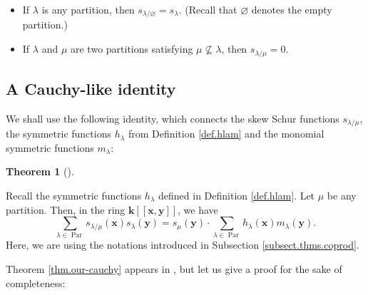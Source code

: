 \documentclass[numbers=enddot,12pt,final,onecolumn,notitlepage]{scrartcl}%
\theoremstyle{definition}
\newtheorem{theo}{Theorem}[section]
\newenvironment{theorem}[1][]
{\begin{theo}[#1]\begin{leftbar}}
{\end{leftbar}\end{theo}}
\let\sumnonlimits\sum
\renewcommand{\sum}{\sumnonlimits\limits}
\begin{document}
\begin{itemize}
\item If $\lambda$ is any partition, then $s_{\lambda/\varnothing}=s_{\lambda
}$. (Recall that $\varnothing$ denotes the empty partition.)

\item If $\lambda$ and $\mu$ are two partitions satisfying $\mu\not \subseteq
\lambda$, then $s_{\lambda/\mu}=0$.
\end{itemize}

\subsection{\label{subsect.proofs.cauchy}A Cauchy-like identity}

We shall use the following identity, which connects the skew Schur functions
$s_{\lambda/\mu}$, the symmetric functions $h_{\lambda}$ from Definition
\ref{def.hlam} and the monomial symmetric functions $m_{\lambda}$:

\begin{theorem}
\label{thm.our-cauchy}Recall the symmetric functions $h_{\lambda}$ defined in
Definition \ref{def.hlam}. Let $\mu$ be any partition. Then, in the ring
$\mathbf{k}\left[  \left[  \mathbf{x},\mathbf{y}\right]  \right]  $, we have%
\[
\sum_{\lambda\in\operatorname*{Par}}s_{\lambda/\mu}\left(  \mathbf{x}\right)
s_{\lambda}\left(  \mathbf{y}\right)  =s_{\mu}\left(  \mathbf{y}\right)
\cdot\sum_{\lambda\in\operatorname*{Par}}h_{\lambda}\left(  \mathbf{x}\right)
m_{\lambda}\left(  \mathbf{y}\right)  .
\]
Here, we are using the notations introduced in Subsection
\ref{subsect.thms.coprod}.
\end{theorem}

Theorem \ref{thm.our-cauchy} appears in \cite[fourth display on page
70]{Macdon95}, but let us give a proof for the sake of completeness:
\end{document}
